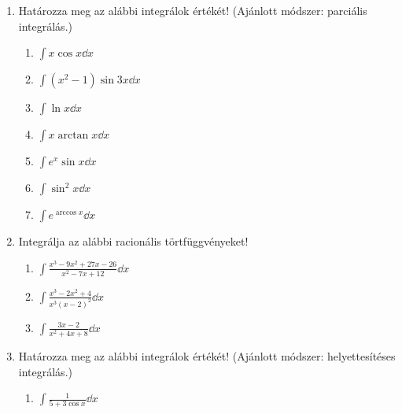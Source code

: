 \documentclass[a4paper, 12pt]{scrartcl}
\begin{document}
\begin{enumerate}
  \item Határozza meg az alábbi integrálok értékét!
        (Ajánlott módszer: parciális integrálás.)
        \begin{enumerate}
          \item $\displaystyle
                  \int x \cos x \dd x
                $

          \item $\displaystyle
                  \int (x^2 - 1) \sin 3x \dd x
                $

          \item $\displaystyle
                  \int \ln x \dd x
                $

          \item $\displaystyle
                  \int x \arctan x \dd x
                $

          \item $\displaystyle
                  \int e^x \sin x \dd x
                $

          \item $\displaystyle
                  \int \sin^2 x \dd x
                $

          \item $\displaystyle
                  \int e^{\arccos x} \dd x
                $
        \end{enumerate}

  \item Integrálja az alábbi racionális törtfüggvényeket!
        \begin{enumerate}
          \item $\displaystyle
                  \int \frac{x^3 - 9x^2 + 27x - 26}{x^2 - 7x + 12} \dd x
                $

          \item $\displaystyle
                  \int \frac{x^3 - 2x^2 + 4}{x^3 (x - 2)^2} \dd x
                $

          \item $\displaystyle
                  \int \frac{3x - 2}{x^2 + 4x + 8} \dd x
                $
        \end{enumerate}

  \item Határozza meg az alábbi integrálok értékét!
        (Ajánlott módszer: helyettesítéses integrálás.)
        \begin{enumerate}
          \item $\displaystyle
                  \int \frac{1}{5 + 3 \cos x} \dd x
                $


\end{enumerate}
\end{enumerate}
\end{document}
